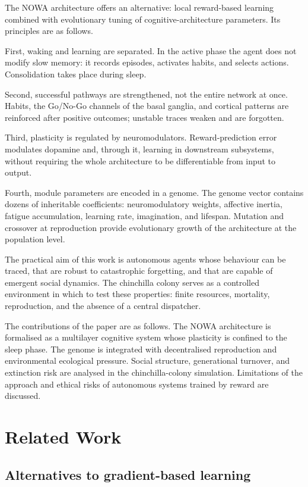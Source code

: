 \documentclass[11pt,a4paper]{article}
\begin{document}
The NOWA architecture offers an alternative: local reward-based learning combined with evolutionary tuning of cognitive-architecture parameters. Its principles are as follows.

First, waking and learning are separated. In the active phase the agent does not modify slow memory: it records episodes, activates habits, and selects actions. Consolidation takes place during sleep.

Second, successful pathways are strengthened, not the entire network at once. Habits, the Go/No-Go channels of the basal ganglia, and cortical patterns are reinforced after positive outcomes; unstable traces weaken and are forgotten.

Third, plasticity is regulated by neuromodulators. Reward-prediction error modulates dopamine and, through it, learning in downstream subsystems, without requiring the whole architecture to be differentiable from input to output.

Fourth, module parameters are encoded in a genome. The genome vector contains dozens of inheritable coefficients: neuromodulatory weights, affective inertia, fatigue accumulation, learning rate, imagination, and lifespan. Mutation and crossover at reproduction provide evolutionary growth of the architecture at the population level.

The practical aim of this work is autonomous agents whose behaviour can be traced, that are robust to catastrophic forgetting, and that are capable of emergent social dynamics. The chinchilla colony serves as a controlled environment in which to test these properties: finite resources, mortality, reproduction, and the absence of a central dispatcher.

The contributions of the paper are as follows. The NOWA architecture is formalised as a multilayer cognitive system whose plasticity is confined to the sleep phase. The genome is integrated with decentralised reproduction and environmental ecological pressure. Social structure, generational turnover, and extinction risk are analysed in the chinchilla-colony simulation. Limitations of the approach and ethical risks of autonomous systems trained by reward are discussed.

\section{Related Work}

\subsection{Alternatives to gradient-based learning}
\end{document}
